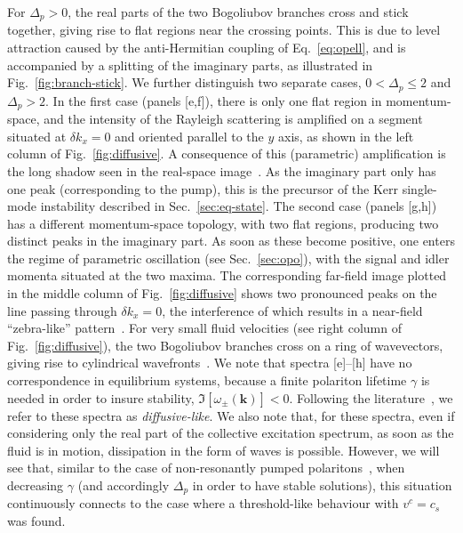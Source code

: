 For $\Delta_p > 0$, the real parts of the two Bogoliubov branches
cross and stick together, giving rise to flat regions near the
crossing points. This is due to level attraction caused by the
anti-Hermitian coupling of Eq.~\eqref{eq:opell}, and is accompanied
by a splitting of the imaginary parts, as illustrated in
Fig.~\ref{fig:branch-stick}. We further distinguish two separate
cases, $0 < \Delta_p \le 2$ and $\Delta_p > 2$.
%
In the first case (panels [e,f]), there is only one flat region in
momentum-space, and the intensity of the Rayleigh scattering is
amplified on a segment situated at $\delta k_x = 0$ and oriented
parallel to the $y$ axis, as shown in the left column of
Fig.~\ref{fig:diffusive}. A consequence of this (parametric)
amplification is the long shadow seen in the real-space
image~\cite{Ciuti_2005}. As the imaginary part only has one peak
(corresponding to the pump), this is the precursor of the Kerr
single-mode instability described in Sec.~\ref{sec:eq-state}.
%
The second case (panels [g,h]) has a different momentum-space
topology, with two flat regions, producing two distinct peaks in the
imaginary part. As soon as these become positive, one enters the
regime of parametric oscillation (see Sec.~\ref{sec:opo}), with the
signal and idler momenta situated at the two maxima. The corresponding
far-field image plotted in the middle column of
Fig.~\ref{fig:diffusive} shows two pronounced peaks on the line
passing through $\delta k_x = 0$, the interference of which results in
a near-field ``zebra-like'' pattern~\cite{Ciuti_2005}. For very small
fluid velocities (see right column of Fig.~\ref{fig:diffusive}), the
two Bogoliubov branches cross on a ring of wavevectors, giving rise to
cylindrical wavefronts~\cite{Van_Regemortel_2014}.
%
We note that spectra [e]--[h] have no correspondence in equilibrium
systems, because a finite polariton lifetime $\gamma$ is needed in
order to insure stability, $\Im[\omega_{\pm}(\bm{k})]<0$. Following
the literature~\cite{Carusotto_2013}, we refer to these spectra as
\emph{diffusive-like}.
%
We also note that, for these spectra, even if considering only the
real part of the collective excitation spectrum, as soon as the fluid
is in motion, dissipation in the form of waves is possible.
%
However, we will see that, similar to the case of non-resonantly
pumped polaritons~\cite{Wouters_2010}, when decreasing $\gamma$ (and
accordingly $\Delta_p$ in order to have stable solutions), this
situation continuously connects to the case where a threshold-like
behaviour with $v^c = c_s$ was found.


